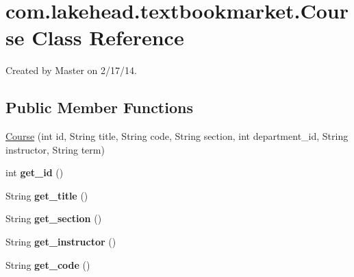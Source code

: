 \hypertarget{classcom_1_1lakehead_1_1textbookmarket_1_1_course}{\section{com.\-lakehead.\-textbookmarket.\-Course Class Reference}
\label{classcom_1_1lakehead_1_1textbookmarket_1_1_course}
}


Created by Master on 2/17/14.  


\subsection*{Public Member Functions}
\begin{DoxyCompactItemize}
\item 
\hyperlink{classcom_1_1lakehead_1_1textbookmarket_1_1_course_a96ee463b55f471dacd665ad5e9879083}{Course} (int id, String title, String code, String section, int department\-\_\-id, String instructor, String term)
\item 
\hypertarget{classcom_1_1lakehead_1_1textbookmarket_1_1_course_a01648b707390bf2dd89fe2f30bef85b4}{int {\bfseries get\-\_\-id} ()}\label{classcom_1_1lakehead_1_1textbookmarket_1_1_course_a01648b707390bf2dd89fe2f30bef85b4}

\item 
\hypertarget{classcom_1_1lakehead_1_1textbookmarket_1_1_course_a71e65f3aa3e665ea7c02c4c66e90b564}{String {\bfseries get\-\_\-title} ()}\label{classcom_1_1lakehead_1_1textbookmarket_1_1_course_a71e65f3aa3e665ea7c02c4c66e90b564}

\item 
\hypertarget{classcom_1_1lakehead_1_1textbookmarket_1_1_course_a590098a48e2b3b58ee956fb2b7d0a8bb}{String {\bfseries get\-\_\-section} ()}\label{classcom_1_1lakehead_1_1textbookmarket_1_1_course_a590098a48e2b3b58ee956fb2b7d0a8bb}

\item 
\hypertarget{classcom_1_1lakehead_1_1textbookmarket_1_1_course_a4b4413ed02c6f9c2fd022dae16cad9f3}{String {\bfseries get\-\_\-instructor} ()}\label{classcom_1_1lakehead_1_1textbookmarket_1_1_course_a4b4413ed02c6f9c2fd022dae16cad9f3}

\item 
\hypertarget{classcom_1_1lakehead_1_1textbookmarket_1_1_course_a13aa695bf7597b0c27acc30d3d599d95}{String {\bfseries get\-\_\-code} ()}\label{classcom_1_1lakehead_1_1textbookmarket_1_1_course_a13aa695bf7597b0c27acc30d3d599d95}


\end{DoxyCompactItemize}
